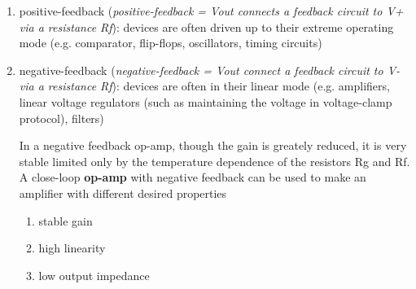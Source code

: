 \begin{enumerate}
  \item positive-feedback ({\it positive-feedback = Vout connects a feedback
  circuit to V+ via a resistance Rf}): devices are often driven up to their
  extreme operating mode (e.g. comparator, flip-flops, oscillators, timing circuits)


  \item negative-feedback ({\it negative-feedback = Vout connect a feedback
  circuit to V- via a resistance Rf}): devices are often in their linear mode
  (e.g.   amplifiers, linear voltage regulators (such as maintaining the
  voltage in voltage-clamp protocol), filters)

In a negative feedback op-amp, though the gain is greately reduced, it is very
stable limited only by the temperature dependence of the resistors Rg and Rf.
A close-loop {\bf op-amp} with negative feedback can be used to
make an amplifier with different desired properties
\begin{enumerate}
  \item stable gain

  \item high linearity

  \item low output impedance
\end{enumerate}

\end{enumerate}



%
%
%
%

